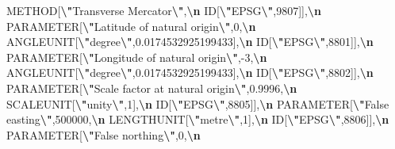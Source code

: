 \documentclass[12pt,a4paper,]{book}
\newenvironment{Shaded}{\begin{snugshade}}{\end{snugshade}}
\newcommand{\SpecialCharTok}[1]{\textcolor[rgb]{0.81,0.36,0.00}{\textbf{#1}}}
\newcommand{\StringTok}[1]{\textcolor[rgb]{0.31,0.60,0.02}{#1}}
\numberwithin{dummy}{section}
\theoremstyle{ocrenumbox}
\theoremstyle{blacknumex}
\theoremstyle{blacknumbox}
\theoremstyle{ocrenum}
\theoremstyle{ocrenum}
\begin{document}
\begin{Shaded}
\begin{Highlighting}[]
\StringTok{            METHOD[}\SpecialCharTok{\textbackslash{}"}\StringTok{Transverse Mercator}\SpecialCharTok{\textbackslash{}"}\StringTok{,}\SpecialCharTok{\textbackslash{}n}
\StringTok{            ID[}\SpecialCharTok{\textbackslash{}"}\StringTok{EPSG}\SpecialCharTok{\textbackslash{}"}\StringTok{,9807]],}\SpecialCharTok{\textbackslash{}n}
\StringTok{            PARAMETER[}\SpecialCharTok{\textbackslash{}"}\StringTok{Latitude of natural origin}\SpecialCharTok{\textbackslash{}"}\StringTok{,0,}\SpecialCharTok{\textbackslash{}n}
\StringTok{            ANGLEUNIT[}\SpecialCharTok{\textbackslash{}"}\StringTok{degree}\SpecialCharTok{\textbackslash{}"}\StringTok{,0.0174532925199433],}\SpecialCharTok{\textbackslash{}n}
\StringTok{            ID[}\SpecialCharTok{\textbackslash{}"}\StringTok{EPSG}\SpecialCharTok{\textbackslash{}"}\StringTok{,8801]],}\SpecialCharTok{\textbackslash{}n}
\StringTok{            PARAMETER[}\SpecialCharTok{\textbackslash{}"}\StringTok{Longitude of natural origin}\SpecialCharTok{\textbackslash{}"}\StringTok{,{-}3,}\SpecialCharTok{\textbackslash{}n}
\StringTok{            ANGLEUNIT[}\SpecialCharTok{\textbackslash{}"}\StringTok{degree}\SpecialCharTok{\textbackslash{}"}\StringTok{,0.0174532925199433],}\SpecialCharTok{\textbackslash{}n}
\StringTok{            ID[}\SpecialCharTok{\textbackslash{}"}\StringTok{EPSG}\SpecialCharTok{\textbackslash{}"}\StringTok{,8802]],}\SpecialCharTok{\textbackslash{}n}
\StringTok{            PARAMETER[}\SpecialCharTok{\textbackslash{}"}\StringTok{Scale factor at natural origin}\SpecialCharTok{\textbackslash{}"}\StringTok{,0.9996,}\SpecialCharTok{\textbackslash{}n}\StringTok{ }
\StringTok{            SCALEUNIT[}\SpecialCharTok{\textbackslash{}"}\StringTok{unity}\SpecialCharTok{\textbackslash{}"}\StringTok{,1],}\SpecialCharTok{\textbackslash{}n}
\StringTok{            ID[}\SpecialCharTok{\textbackslash{}"}\StringTok{EPSG}\SpecialCharTok{\textbackslash{}"}\StringTok{,8805]],}\SpecialCharTok{\textbackslash{}n}
\StringTok{            PARAMETER[}\SpecialCharTok{\textbackslash{}"}\StringTok{False easting}\SpecialCharTok{\textbackslash{}"}\StringTok{,500000,}\SpecialCharTok{\textbackslash{}n}
\StringTok{            LENGTHUNIT[}\SpecialCharTok{\textbackslash{}"}\StringTok{metre}\SpecialCharTok{\textbackslash{}"}\StringTok{,1],}\SpecialCharTok{\textbackslash{}n}
\StringTok{            ID[}\SpecialCharTok{\textbackslash{}"}\StringTok{EPSG}\SpecialCharTok{\textbackslash{}"}\StringTok{,8806]],}\SpecialCharTok{\textbackslash{}n}
\StringTok{            PARAMETER[}\SpecialCharTok{\textbackslash{}"}\StringTok{False northing}\SpecialCharTok{\textbackslash{}"}\StringTok{,0,}\SpecialCharTok{\textbackslash{}n}

\end{Highlighting}
\end{Shaded}
\end{document}
